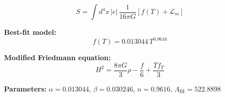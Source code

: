 
\begin{equation}
  S = \int d^4x \, |e| \, \frac{1}{16\pi G} \left[ f(T) + \mathcal{L}_m \right]
\end{equation}

\textbf{Best-fit model:}
\begin{equation}
  f(T) = 0.013044 \, T^{0.9616}
\end{equation}

\textbf{Modified Friedmann equation:}
\begin{equation}
  H^2 = \frac{8\pi G}{3} \rho - \frac{f}{6} + \frac{T f_T}{3}
\end{equation}

\textbf{Parameters:}
$\alpha = 0.013044$, \quad
$\beta = 0.030246$, \quad
$n = 0.9616$, \quad
$\Lambda_{\text{BI}} = 522.8898$